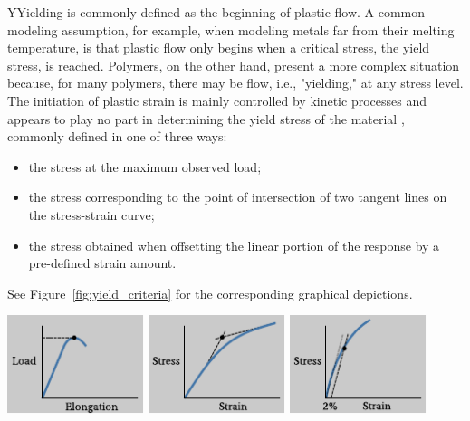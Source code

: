 \begin{remark}
YYielding is commonly defined as the beginning of plastic flow.
A common modeling assumption, for example, when modeling metals far from their melting temperature, is that plastic flow only begins when a critical stress, the yield stress, is reached.
Polymers, on the other hand, present a more complex situation because, for many polymers, there may be flow, i.e., "yielding," at any stress level.
The initiation of plastic strain is mainly controlled by kinetic processes and appears to play no part in determining the yield stress of the material \citep{fotheringhamRoleRecoveryForces1978}, commonly defined in one of three ways: \citep{wardReviewYieldBehaviour1971}
    \begin{itemize}
        \item the stress at the maximum observed load;
        \item the stress corresponding to the point of intersection of two tangent lines on the stress-strain curve;
        \item the stress obtained when offsetting the linear portion of the response by a pre-defined strain amount.
    \end{itemize}
    See Figure~\ref{fig:yield_criteria} for the corresponding graphical depictions.
    \begin{center}
            \centering
                                \includegraphics[width=0.3\textwidth]{figures/yield_criterion_a}
                \hfill
                            \includegraphics[width=0.3\textwidth]{figures/yield_criterion_b}
            \hfill
                                \includegraphics[width=0.3\textwidth]{figures/yield_criterion_c}
        \label{fig:yield_criteria}
    \end{center}
\label{rmrk:yield_polymer}
\end{remark}

